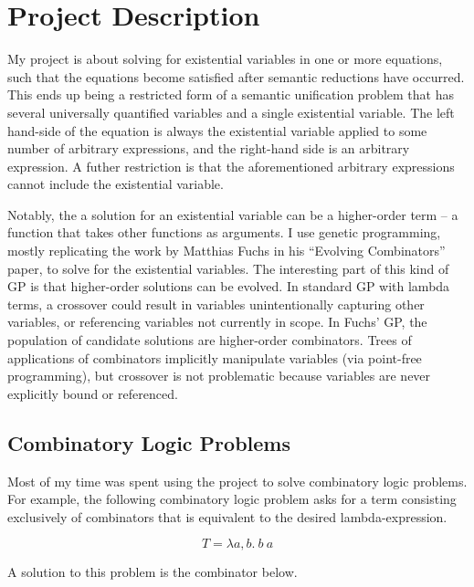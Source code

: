 \documentclass{article}
\begin{document}
\maketitle

\section{Project Description}

My project is about solving for existential variables in one or more
equations, such that the equations become satisfied after semantic
reductions have occurred. This ends up being a restricted form of a
semantic unification problem that has several universally quantified
variables and a single existential variable. The left hand-side of the
equation is always the existential variable applied to some number of
arbitrary expressions, and the right-hand side is an arbitrary
expression. A futher restriction is that the aforementioned arbitrary
expressions cannot include the existential variable.

Notably, the a solution for an existential variable can be a
higher-order term -- a function that takes other functions as
arguments. I use genetic programming, mostly replicating the work by
Matthias Fuchs in his ``Evolving Combinators'' paper, to solve for the
existential variables. The interesting part of this kind of GP is that
higher-order solutions can be evolved. In standard GP with lambda
terms, a crossover could result in variables unintentionally capturing
other variables, or referencing variables not currently in scope. In
Fuchs' GP, the population of candidate solutions are higher-order
combinators. Trees of applications of combinators implicitly
manipulate variables (via point-free programming), but crossover is
not problematic because variables are never explicitly bound or
referenced.

\subsection{Combinatory Logic Problems}

Most of my time was spent using the project to solve combinatory logic
problems. For example, the following combinatory logic problem asks for a term
consisting exclusively of combinators that is equivalent to the
desired lambda-expression.

$$
T = \lambda a,b . ~ b ~ a
$$

A solution to this problem is the combinator below.
\end{document}
